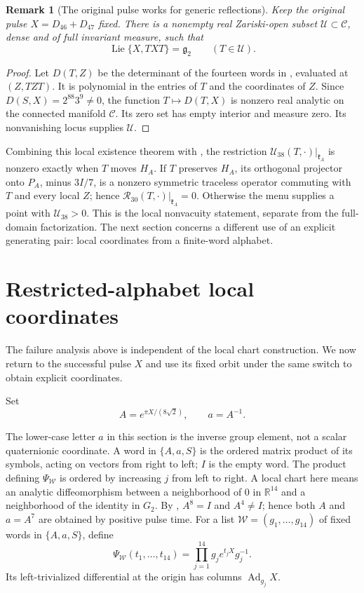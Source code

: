 \documentclass[11pt,a4paper]{article}
\newtheorem{remark}[remark]{Remark}
\newcommand{\RR}{\mathbb R}
\newcommand{\Lie}{\operatorname{Lie}}
\newcommand{\Ad}{\operatorname{Ad}}
\begin{document}
\begin{remark}[The original pulse works for generic reflections]
\label{thm:generic-reflections}
Keep the original pulse $X=D_{46}+D_{47}$ fixed.  There is a nonempty real Zariski-open subset $\mathscr U\subset\mathscr C$, dense and of full invariant measure, such that
\[
\Lie\{X,TXT\}=\mathfrak g_2\qquad(T\in\mathscr U).
\]
\end{remark}

\begin{proof}
Let $D(T,Z)$ be the determinant of the fourteen words in , evaluated at $(Z,TZT)$.  It is polynomial in the entries of $T$ and the coordinates of $Z$.  Since $D(S,X)=2^{88}3^9\ne0$, the function $T\mapsto D(T,X)$ is nonzero real analytic on the connected manifold $\mathscr C$.  Its zero set has empty interior and measure zero.  Its nonvanishing locus supplies $\mathscr U$.
\end{proof}

Combining this local existence theorem with , the restriction $\mathcal U_{38}(T,\cdot)|_{\mathfrak k_A}$ is nonzero exactly when $T$ moves $H_A$.
If $T$ preserves $H_A$, its orthogonal projector onto $P_A$, minus $3I/7$, is a nonzero symmetric traceless operator commuting with $T$ and every local $Z$; hence $\mathcal R_{30}(T,\cdot)|_{\mathfrak k_A}=0$.
Otherwise the menu supplies a point with $\mathcal U_{38}>0$.
This is the local nonvacuity statement, separate from the full-domain factorization.  The next section concerns a different use of an explicit generating pair: local coordinates from a finite-word alphabet.


\section{Restricted-alphabet local coordinates}
\label{sec:charts}
The failure analysis above is independent of the local chart construction.  We now return to the successful pulse $X$ and use its fixed orbit under the same switch to obtain explicit coordinates.

Set
\[
A=e^{\pi X/(8\sqrt2)},\qquad a=A^{-1}.
\]

The lower-case letter $a$ in this section is the inverse group element, not a scalar quaternionic coordinate.  A word in $\{A,a,S\}$ is the ordered matrix product of its symbols, acting on vectors from right to left; $I$ is the empty word.  The product defining $\Psi_{\mathcal W}$ is ordered by increasing $j$ from left to right.  A local chart here means an analytic diffeomorphism between a neighborhood of $0$ in $\RR^{14}$ and a neighborhood of the identity in $G_2$.
By , $A^8=I$ and $A^4\ne I$; hence both $A$ and $a=A^7$ are obtained by positive pulse time.  For a list $\mathcal W=(g_1,\ldots,g_{14})$ of fixed words in $\{A,a,S\}$, define
\[
\Psi_{\mathcal W}(t_1,\ldots,t_{14})
=\prod_{j=1}^{14}g_j e^{t_jX}g_j^{-1}.
\]
Its left-trivialized differential at the origin has columns $\Ad_{g_j}X$.
\end{document}
